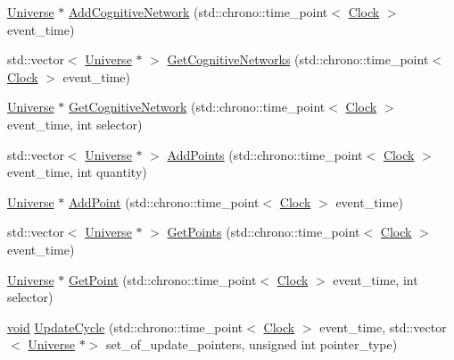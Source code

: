 \begin{DoxyCompactItemize}
\item 
\mbox{\hyperlink{class_universe}{Universe}} $\ast$ \mbox{\hyperlink{class_universe_ab682307c963836cd81b35b5604bd7064}{Add\+Cognitive\+Network}} (std\+::chrono\+::time\+\_\+point$<$ \mbox{\hyperlink{universe_8h_a0ef8d951d1ca5ab3cfaf7ab4c7a6fd80}{Clock}} $>$ event\+\_\+time)
\item 
std\+::vector$<$ \mbox{\hyperlink{class_universe}{Universe}} $\ast$ $>$ \mbox{\hyperlink{class_universe_a06968a24194280a43f077c5b77379ea8}{Get\+Cognitive\+Networks}} (std\+::chrono\+::time\+\_\+point$<$ \mbox{\hyperlink{universe_8h_a0ef8d951d1ca5ab3cfaf7ab4c7a6fd80}{Clock}} $>$ event\+\_\+time)
\item 
\mbox{\hyperlink{class_universe}{Universe}} $\ast$ \mbox{\hyperlink{class_universe_a1ea2b7e438bfdc7dd599aa59c310b126}{Get\+Cognitive\+Network}} (std\+::chrono\+::time\+\_\+point$<$ \mbox{\hyperlink{universe_8h_a0ef8d951d1ca5ab3cfaf7ab4c7a6fd80}{Clock}} $>$ event\+\_\+time, int selector)
\item 
std\+::vector$<$ \mbox{\hyperlink{class_universe}{Universe}} $\ast$ $>$ \mbox{\hyperlink{class_universe_aa48ced2078ba863723050d8283b3fa67}{Add\+Points}} (std\+::chrono\+::time\+\_\+point$<$ \mbox{\hyperlink{universe_8h_a0ef8d951d1ca5ab3cfaf7ab4c7a6fd80}{Clock}} $>$ event\+\_\+time, int quantity)
\item 
\mbox{\hyperlink{class_universe}{Universe}} $\ast$ \mbox{\hyperlink{class_universe_a8508b791c6997d8abcdcc037a6776734}{Add\+Point}} (std\+::chrono\+::time\+\_\+point$<$ \mbox{\hyperlink{universe_8h_a0ef8d951d1ca5ab3cfaf7ab4c7a6fd80}{Clock}} $>$ event\+\_\+time)
\item 
std\+::vector$<$ \mbox{\hyperlink{class_universe}{Universe}} $\ast$ $>$ \mbox{\hyperlink{class_universe_a765c6c658b7a465cd92418690db846ae}{Get\+Points}} (std\+::chrono\+::time\+\_\+point$<$ \mbox{\hyperlink{universe_8h_a0ef8d951d1ca5ab3cfaf7ab4c7a6fd80}{Clock}} $>$ event\+\_\+time)
\item 
\mbox{\hyperlink{class_universe}{Universe}} $\ast$ \mbox{\hyperlink{class_universe_a3774f14a13a55827a1a4eea0a404edcb}{Get\+Point}} (std\+::chrono\+::time\+\_\+point$<$ \mbox{\hyperlink{universe_8h_a0ef8d951d1ca5ab3cfaf7ab4c7a6fd80}{Clock}} $>$ event\+\_\+time, int selector)
\item 
\mbox{\hyperlink{glad_8h_a950fc91edb4504f62f1c577bf4727c29}{void}} \mbox{\hyperlink{class_universe_a0d79e614e1af951c06b78cb5768f9c8e}{Update\+Cycle}} (std\+::chrono\+::time\+\_\+point$<$ \mbox{\hyperlink{universe_8h_a0ef8d951d1ca5ab3cfaf7ab4c7a6fd80}{Clock}} $>$ event\+\_\+time, std\+::vector$<$ \mbox{\hyperlink{class_universe}{Universe}} $\ast$$>$ set\+\_\+of\+\_\+update\+\_\+pointers, unsigned int pointer\+\_\+type)
$$
\end{DoxyCompactItemize}
